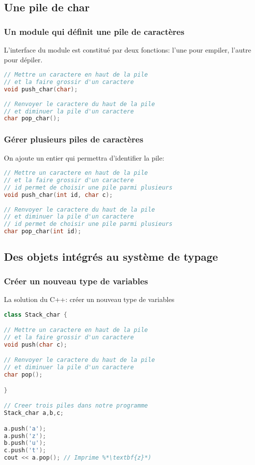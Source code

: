 \documentclass{beamer}
\begin{document}
\subsection{Une pile de char}
  
\begin{frame}[fragile=singleslide,shrink=20]
\frametitle {Un module qui définit une pile de caractères}
L'interface du module est constitué par deux fonctions: l'une pour empiler, l'autre pour dépiler.
\begin{lstlisting}[language=c++]
// Mettre un caractere en haut de la pile 
// et la faire grossir d'un caractere
void push_char(char);
  
// Renvoyer le caractere du haut de la pile 
// et diminuer la pile d'un caractere
char pop_char();  
\end{lstlisting} 
\end{frame}
  
\begin{frame}[fragile=singleslide,shrink=20]
\frametitle {Gérer plusieurs piles de caractères}
On ajoute un entier qui permettra d'identifier la pile:
\begin{lstlisting}[language=c++]
// Mettre un caractere en haut de la pile 
// et la faire grossir d'un caractere
// id permet de choisir une pile parmi plusieurs
void push_char(int id, char c);
  
// Renvoyer le caractere du haut de la pile 
// et diminuer la pile d'un caractere
// id permet de choisir une pile parmi plusieurs
char pop_char(int id);  
\end{lstlisting} 
\end{frame}

\subsection{Des objets intégrés au système de typage}

\begin{frame}[fragile=singleslide,shrink=20]
\frametitle {Créer un nouveau type de variables}
La solution du C++: créer un \alert{nouveau type} de variables

\begin{lstlisting}[language=c++]
class Stack_char {

// Mettre un caractere en haut de la pile 
// et la faire grossir d'un caractere
void push(char c);

// Renvoyer le caractere du haut de la pile 
// et diminuer la pile d'un caractere
char pop();

}

// Creer trois piles dans notre programme
Stack_char a,b,c;

a.push('a');
a.push('z');
b.push('u');
c.push('t');
cout << a.pop(); // Imprime %*\textbf{z}*)
\end{lstlisting} 
\end{frame}
  
\end{document}
